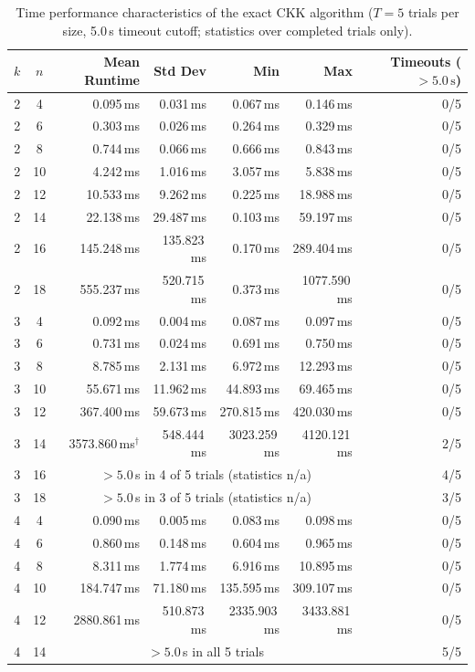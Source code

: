\documentclass[11pt,a4paper]{article}
\begin{document}
\begin{table}[H]
\footnotesize
\setlength{\tabcolsep}{4pt}
\caption{Time performance characteristics of the exact CKK algorithm ($T=5$ trials per size, 5.0\,s timeout cutoff; statistics over completed trials only).}
\label{tab:ckk_runtime}
\begin{tabular}{ccrrrrr}
\toprule
$k$ & $n$ & Mean Runtime & Std Dev & Min & Max & Timeouts ($>5.0\,\text{s}$) \\
\midrule
2 & 4  & 0.095\,ms   & 0.031\,ms  & 0.067\,ms  & 0.146\,ms    & 0/5 \\
2 & 6  & 0.303\,ms   & 0.026\,ms  & 0.264\,ms  & 0.329\,ms    & 0/5 \\
2 & 8  & 0.744\,ms   & 0.066\,ms  & 0.666\,ms  & 0.843\,ms    & 0/5 \\
2 & 10 & 4.242\,ms   & 1.016\,ms  & 3.057\,ms  & 5.838\,ms    & 0/5 \\
2 & 12 & 10.533\,ms  & 9.262\,ms  & 0.225\,ms  & 18.988\,ms   & 0/5 \\
2 & 14 & 22.138\,ms  & 29.487\,ms & 0.103\,ms  & 59.197\,ms   & 0/5 \\
2 & 16 & 145.248\,ms & 135.823\,ms & 0.170\,ms & 289.404\,ms  & 0/5 \\
2 & 18 & 555.237\,ms & 520.715\,ms & 0.373\,ms & 1077.590\,ms & 0/5 \\
\midrule
3 & 4  & 0.092\,ms   & 0.004\,ms  & 0.087\,ms  & 0.097\,ms    & 0/5 \\
3 & 6  & 0.731\,ms   & 0.024\,ms  & 0.691\,ms  & 0.750\,ms    & 0/5 \\
3 & 8  & 8.785\,ms   & 2.131\,ms  & 6.972\,ms  & 12.293\,ms   & 0/5 \\
3 & 10 & 55.671\,ms  & 11.962\,ms & 44.893\,ms & 69.465\,ms   & 0/5 \\
3 & 12 & 367.400\,ms & 59.673\,ms & 270.815\,ms & 420.030\,ms & 0/5 \\
3 & 14 & 3573.860\,ms$^\dagger$ & 548.444\,ms & 3023.259\,ms & 4120.121\,ms & 2/5 \\
3 & 16 & \multicolumn{4}{c}{$>5.0$\,s in 4 of 5 trials (statistics n/a)} & 4/5 \\
3 & 18 & \multicolumn{4}{c}{$>5.0$\,s in 3 of 5 trials (statistics n/a)} & 3/5 \\
\midrule
4 & 4  & 0.090\,ms   & 0.005\,ms  & 0.083\,ms  & 0.098\,ms    & 0/5 \\
4 & 6  & 0.860\,ms   & 0.148\,ms  & 0.604\,ms  & 0.965\,ms    & 0/5 \\
4 & 8  & 8.311\,ms   & 1.774\,ms  & 6.916\,ms  & 10.895\,ms   & 0/5 \\
4 & 10 & 184.747\,ms & 71.180\,ms & 135.595\,ms & 309.107\,ms & 0/5 \\
4 & 12 & 2880.861\,ms & 510.873\,ms & 2335.903\,ms & 3433.881\,ms & 0/5 \\
4 & 14 & \multicolumn{4}{c}{$>5.0$\,s in all 5 trials} & 5/5 \\
\bottomrule
\end{tabular}


\end{table}
\end{document}
